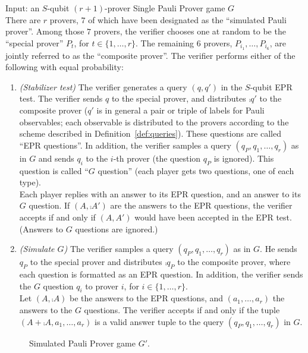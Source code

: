 \begin{center}
\begin{mdframed}
    Input: an $S$-qubit $(r+1)$-prover Single Pauli Prover game $G$ \\
		There are $r$ provers, $7$ of which have been designated as the ``simulated Pauli prover''. Among those $7$ provers, the verifier chooses one at random to be the ``special prover'' $P_t$, for $t\in\{1,\ldots,r\}$. The remaining $6$ provers, $P_{i_1},\ldots,P_{i_6}$, are jointly referred to as the ``composite prover''. The verifier performs either of the following with equal probability: 
	\begin{enumerate}
		\item \emph{(Stabilizer test)} The verifier generates a query $(q,q')$ in the $S$-qubit EPR test.  The verifier sends $q$ to the special prover, and distributes $\comp{q'}$ to the composite prover ($q'$ is in general a pair or triple of labels for Pauli observables; each observable is distributed to the provers according to the scheme described in Definition~\ref{def:queries}). These questions are called ``EPR questions''. In addition, the verifier samples a query $(q_P,q_1,\ldots,q_r)$ as in $G$ and sends $q_i$ to the $i$-th prover (the question $q_P$ is ignored). This question is called ``$G$ question'' (each player gets two questions, one of each type).\\
	Each player replies with an answer to its EPR question, and an answer to its $G$ question. If $(A,\comp{A'})$ are the answers to the EPR questions, the verifier accepts if and only if $(A,A')$ would have been accepted in the EPR test. (Answers to $G$ questions are ignored.)  
		\item \emph{(Simulate $G$)} The verifier samples a query $(q_P,q_1,\ldots,q_r)$ as in $G$. He sends $q_P$ to the special prover and distributes $\comp{q_P}$ to the composite prover, where each question is formatted as an EPR question. In addition, the verifier sends the $G$ question $q_i$ to prover $i$, for $i\in\{1,\ldots,r\}$.\\
		Let $(A,\comp{A})$ be the answers to the EPR questions, and $(a_1,\ldots,a_r)$ the answers to the $G$ questions. The verifier accepts if and only if the tuple $(A+\comp{A},a_1,\ldots,a_r)$ is a valid answer tuple to the query $(q_P,q_1,\ldots,q_r)$ in $G$.
	\end{enumerate}    
\end{mdframed}
\end{center}
\begin{figure}[H]
\caption{Simulated Pauli Prover game $G'$.}
\label{fig:simpauli_check}
\end{figure}

